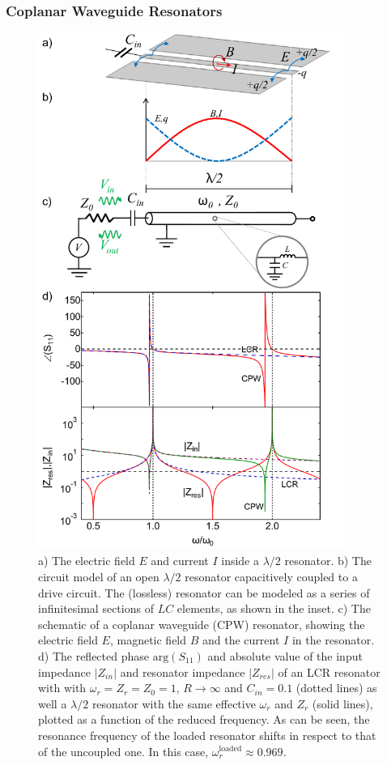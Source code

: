 \subsubsection{Coplanar Waveguide Resonators}

\begin{figure}
	\includegraphics[width=10cm]{"./material/mathematica/lcr_and_cpw_schematic_with_plots"}
	\caption{a) The electric field $E$ and current $I$ inside a $\lambda/2$ resonator. b) The circuit model of an open $\lambda/2$ resonator capacitively coupled to a drive circuit. The (lossless) resonator can be modeled as a series of infinitesimal sections of $LC$ elements, as shown in the inset. c) The schematic of a coplanar waveguide (CPW) resonator, showing the electric field $E$, magnetic field $B$ and the current $I$ in the resonator. d) The reflected phase $\mathrm{arg}(S_{11})$ and absolute value of the input impedance $|Z_{in}|$ and resonator impedance $|Z_{res}|$ of an LCR resonator with with $\omega_r=Z_r=Z_0=1$, $R\to\infty$ and $C_{in}=0.1$ (dotted lines) as well a $\lambda/2$ resonator with the same effective $\omega_r$ and $Z_r$ (solid lines), plotted as a function of the reduced frequency. As can be seen, the resonance frequency of the loaded resonator shifts in respect to that of the uncoupled one. In this case, $\omega_{r}^\mathrm{loaded}\approx 0.969$.}
	\label{fig:lambda_over_2_response}
\end{figure}

